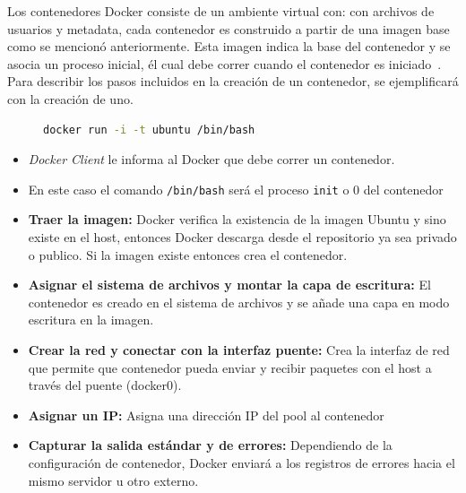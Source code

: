 Los contenedores Docker consiste de un ambiente virtual con: con archivos de usuarios y metadata, cada contenedor es construido a partir de una imagen base como se mencionó anteriormente. 
Esta imagen indica la base del contenedor y se asocia un proceso inicial, él cual debe correr cuando el contenedor es iniciado~\cite{Docker:2015:understanding}. Para describir los pasos incluidos en la creación de un contenedor, se ejemplificará con la creación de uno.

\begin{figure}
	\begin{lstlisting}[caption={Ejemplo de la ejecutación de un contenedor utilizando la imagen Docker},label={lst:tensorflow},language=bash]
	docker run -i -t ubuntu /bin/bash
\end{lstlisting}
\end{figure}

	\begin{itemize}
		\item \emph{Docker Client} le informa al Docker que debe correr un contenedor.
		\item En este caso el comando \texttt{/bin/bash} será el proceso \texttt{init} o 0 del contenedor
		\item \textbf{Traer la imagen:} Docker verifica la existencia de la imagen Ubuntu y sino existe en el host, entonces Docker descarga desde el repositorio ya sea privado o publico. Si la imagen existe entonces crea el contenedor.
		\item \textbf{Asignar el sistema de archivos y montar la capa de escritura:} El contenedor es creado en el sistema de archivos y se añade una capa en modo escritura en la imagen.
		\item \textbf{Crear la red y conectar con la interfaz puente:} Crea la interfaz de red que permite que contenedor pueda enviar y recibir paquetes con el host a través del puente (docker0).
		\item \textbf{Asignar un IP:} Asigna una dirección IP del pool al contenedor
		\item \textbf{Capturar la salida estándar y de errores:} Dependiendo de la configuración de contenedor, Docker enviará a los registros de errores hacia el mismo servidor u otro externo.
	\end{itemize}

